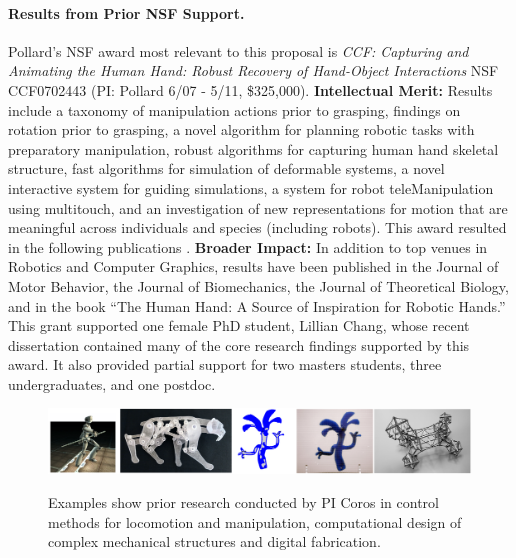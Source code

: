 \paragraph{Results from Prior NSF Support.}
Pollard's NSF award most relevant to this proposal is \emph{CCF: Capturing and Animating the Human Hand: Robust Recovery of Hand-Object Interactions} NSF CCF0702443
(PI:  Pollard  6/07 - 5/11, \$325,000).
{\bf Intellectual Merit:}  Results include a taxonomy of manipulation actions prior to grasping, findings on rotation prior to grasping, a novel algorithm for planning robotic tasks with preparatory manipulation, robust
algorithms for capturing human hand skeletal structure, fast algorithms for simulation of deformable systems, a novel interactive system for guiding
simulations, a system for robot teleManipulation using multitouch, and an investigation of new
representations for motion that are meaningful across 
individuals and species (including robots).  This award resulted in the following
publications
\cite{Toh:2012,Chang:2014,Gatesy:2011,Kappler:2012,Kim:ToG11,Kim:CGA11,Koonjul:ICRA11,Chang:JMB10,Chang:ICRA10,Kappler:Humanoids10,Chang:2009,Chang:twoAxis08,Chang:Humanoids08}.
{\bf Broader Impact:}  In addition to top venues in Robotics and Computer Graphics, results
have been published in the Journal of Motor Behavior, the Journal of
Biomechanics, the Journal of Theoretical Biology, and
in the book ``The Human Hand: A Source of Inspiration for
Robotic Hands.''  This grant supported one female PhD student, Lillian Chang,
whose recent dissertation contained many of the core research findings
supported by this award.  It also provided partial support for two masters students, three undergraduates,
and one postdoc.

\begin{figure}
\begin{center}
{\includegraphics[width=\linewidth]{./figs/corosPrior}}
\end{center}
\caption{Examples show prior research conducted by PI Coros in control methods for locomotion and manipulation, computational design of complex mechanical structures and digital fabrication.}
\label{fig:corosPrior}
\end{figure}

